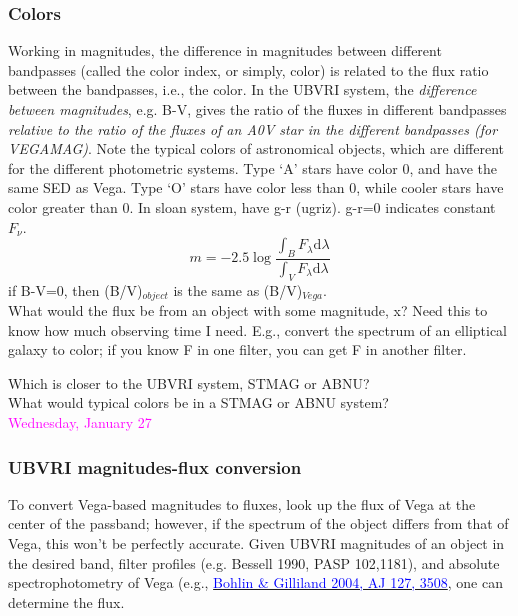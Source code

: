 \documentclass[12pt]{article}
\begin{document}
\subsubsection*{Colors}
Working in magnitudes, the difference in magnitudes between different
bandpasses (called the color index, or simply, color) is related to
the flux ratio between the bandpasses, i.e., the color.
In the UBVRI
system, the \emph{difference between magnitudes}, e.g. B-V,
gives the ratio of the fluxes in different bandpasses
\emph{relative to the ratio of the fluxes of
an A0V star in the different bandpasses (for VEGAMAG)}.
Note the typical colors of astronomical objects,
which are different for the different photometric systems.
Type `A' stars have color 0, and have the same SED as Vega.
Type `O' stars have color less than 0,
while cooler stars have color greater than 0.
In sloan system, have  g-r (ugriz). g-r=0 indicates constant
$F_{\nu}$.
\begin{equation*}
    m = -2.5\log\frac{\int_B F_{\lambda}\textrm{d}\lambda}
    {\int_V F_{\lambda}\textrm{d}\lambda}
\end{equation*}
if B-V=0, then (B/V)$_{object}$ is the same as (B/V)$_{Vega}$.\\

\noindent What would the flux be from an object with some magnitude,
x? Need this to know how much observing time I need. E.g., convert the
spectrum of an elliptical galaxy to color; if you know F in one
filter, you can get F in another filter.

\noindent Which is closer to the UBVRI system, STMAG or ABNU?\\
\noindent What would typical colors be in a STMAG or ABNU system?\\

\noindent \textcolor{magenta}{Wednesday, January 27}

\subsubsection*{
UBVRI magnitudes-flux conversion
}
To convert Vega-based magnitudes to fluxes, look up the flux of Vega
at the center of the passband; however, if the spectrum of the object
differs from that of Vega, this won't be perfectly accurate. Given
UBVRI magnitudes of an object in the desired band, filter profiles
(e.g. Bessell 1990, PASP 102,1181), and absolute spectrophotometry of
Vega (e.g., \href{http://adsabs.harvard.edu/abs/2004AJ....127.3508B}
{\textcolor{blue}{Bohlin \& Gilliland 2004, AJ 127, 3508}},
one can determine the flux.\\
\end{document}

